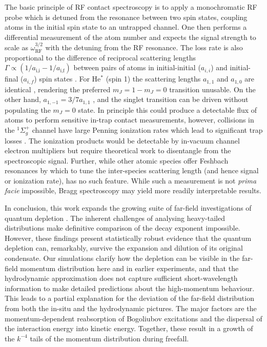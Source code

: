 {	The basic principle of RF contact spectroscopy is to apply a monochromatic RF probe which is detuned from the resonance between two spin states, coupling atoms in the initial spin state to an untrapped channel. 
	One then performs a differential measurement of the atom number and expects the signal strength to scale as $\omega_\textrm{RF}^{3/2}$ with the detuning from the RF resonance.
	The loss rate is also proportional to the difference of reciprocal scattering lengths $\Gamma\propto(1/a_\textrm{i,i}-1/a_\textrm{i,f})$ between pairs of atoms in initial-initial ($a_{i,i}$) and initial-final ($a_{i,f}$) spin states \cite{Braaten10,Wild12}. 
	For He$^*$ (spin 1) the scattering lengths $a_{1,1}$ and $a_{1,0}$ are identical \cite{Leo01}, rendering the preferred $m_J=1-m_J=0$ transition unusable. 
	On the other hand, $a_{1,-1} = 3/7 a_{1,1}$ \cite{Vassen16}, and the singlet transition can be driven without populating the $m_J=0$ state. 
	In principle this could produce a detectable flux of atoms to perform sensitive in-trap contact measurements, however, collisions in the $^1\Sigma_{g}^{+}$ channel have large Penning ionization rates which lead to significant trap losses \cite{Leo01}. 
	The ionization products would be detectable by in-vacuum channel electron multipliers but require theoretical work to disentangle from the spectroscopic signal. 
	Further, while other atomic species offer Feshbach resonances by which to tune the inter-species scattering length (and hence signal or ionization rate), \mhe has no such feature. 
	While such a measurement is not \emph{prima facie} impossible, Bragg spectroscopy may yield more readily interpretable results.

	In conclusion, this work expands the growing suite of far-field investigations of quantum depletion \cite{Cayla20,Chang16}.
	The inherent challenges of analysing heavy-tailed distributions make definitive comparison of the decay exponent impossible.
	However, these findings present statistically robust evidence that the quantum depletion can, remarkably, survive the expansion and dilution of its original condensate. 
	Our simulations clarify how the depletion can be visible in the far-field momentum distribution here and in earlier experiments, and that the hydrodynamic approximation does not capture sufficient short-wavelength information to make detailed predictions about the high-momentum behaviour. 
	This leads to a  partial explanation for the deviation of the far-field distribution from both the in-situ and the hydrodynamic pictures. The major factors are the momentum-dependent reabsorption of Bogoliubov excitations and the dispersal of the {interaction energy} into kinetic energy. 
	Together, these result in a growth of the $k^{-4}$ tails of the momentum distribution during freefall. 


}
